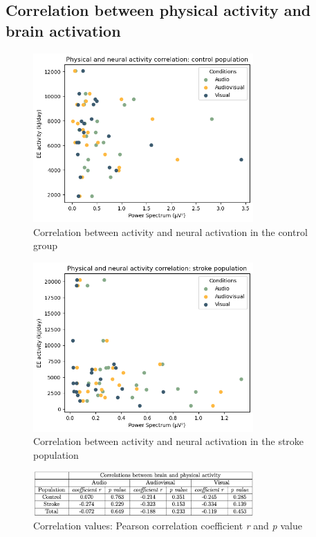 \clearpage
\subsection*{Correlation between physical activity and brain activation}
\begin{figure}[H]
    \centering
    \includegraphics[width=0.75\textwidth]{correlations/correlation_healthy.png}
    \caption{Correlation between activity and neural activation in the control group}
    \label{fig: correlation control} 
\end{figure}
\begin{figure}[H]
    \centering
    \includegraphics[width=0.75\textwidth]{correlations/correlation_stroke.png}
    \caption{Correlation between activity and neural activation in the stroke population}
    \label{fig: correlation stroke} 
\end{figure}
\begin{figure}[H]
    \centering
    \includegraphics[width=0.75\textwidth]{correlations/corr_values_activeq.png}
    \caption{Correlation values: Pearson correlation coefficient \textit{r} and \textit{p} value}
    \label{fig: correlation values} 
\end{figure}

